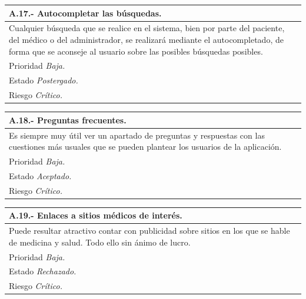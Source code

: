 \documentclass[a4paper,oneside,11pt]{book}
\begin{document}
\begin{center}
\begin{tabulary}{15cm}{|L|}
	\hline
		\bf{A.17.- Autocompletar las búsquedas.} \\
	\hline
		Cualquier búsqueda que se realice en el sistema, bien por parte del paciente, del médico o del administrador, se realizará mediante el autocompletado, de forma que se aconseje al usuario sobre las posibles búsquedas posibles. \\
	\hline
		Prioridad \textit{Baja.} \\
	\hline
		Estado \textit{Postergado.} \\
	\hline
		Riesgo \textit{Crítico.} \\
	\hline
\end{tabulary}
\end{center}

\begin{center}
\begin{tabulary}{15cm}{|L|}
	\hline
		\bf{A.18.- Preguntas frecuentes.} \\
	\hline
		Es siempre muy útil ver un apartado de preguntas y respuestas con las cuestiones más usuales que se pueden plantear los usuarios de la aplicación. \\
	\hline
		Prioridad \textit{Baja.} \\
	\hline
		Estado \textit{Aceptado.} \\
	\hline
		Riesgo \textit{Crítico.} \\
	\hline
\end{tabulary}
\end{center}

\begin{center}
\begin{tabulary}{15cm}{|L|}
	\hline
		\bf{A.19.- Enlaces a sitios médicos de interés.} \\
	\hline
		Puede resultar atractivo contar con publicidad sobre sitios en los que se hable de medicina y salud. Todo ello sin ánimo de lucro. \\
	\hline
		Prioridad \textit{Baja.} \\
	\hline
		Estado \textit{Rechazado.} \\
	\hline
		Riesgo \textit{Crítico.} \\
	\hline
\end{tabulary}
\end{center}
\end{document}
